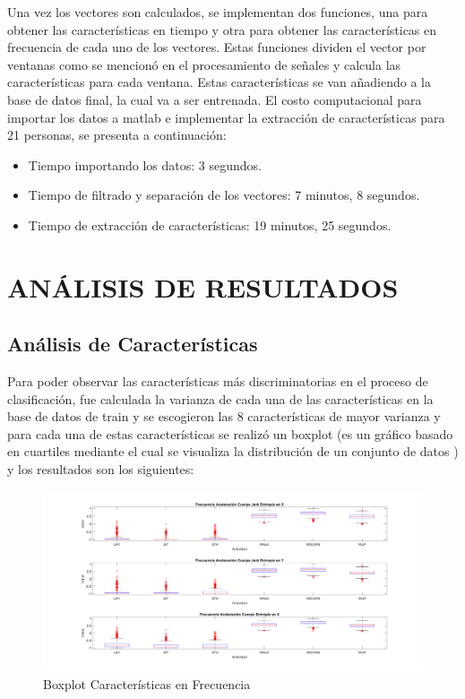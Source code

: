 \documentclass[11pt]{report}
\begin{document}
Una vez los vectores son calculados, se implementan dos funciones, una para obtener las características en tiempo y otra para obtener las características en frecuencia de cada uno de los vectores. Estas funciones dividen el vector por ventanas como se mencionó en el procesamiento de señales y calcula las características para cada ventana. Estas características se van añadiendo a la base de datos final, la cual va a ser entrenada. El costo computacional para importar los datos a matlab e implementar la extracción de características para 21 personas, se presenta a continuación:

\begin{itemize}
\item Tiempo importando los datos: 3 segundos.
\item Tiempo de filtrado y separación de los vectores: 7 minutos, 8 segundos.
\item Tiempo de extracción de características: 19 minutos, 25 segundos.
\end{itemize}

\chapter{ANÁLISIS DE RESULTADOS}

\section{Análisis de Características}

Para poder observar las características más discriminatorias en el proceso de clasificación, fue calculada la varianza de cada una de las características en la base de datos de train y se escogieron las 8 características de mayor varianza y para cada una de estas características se realizó un boxplot (es un gráfico basado en cuartiles mediante el cual se visualiza la distribución de un conjunto de datos \cite{boxplot}) y los resultados son los siguientes:

\begin{figure}[H]
  \centering
    \includegraphics[width=1\textwidth]{varianza_frecuencia}
   \caption{Boxplot Características en Frecuencia}
\end{figure}
\end{document}
